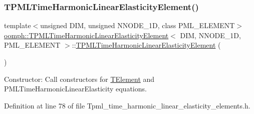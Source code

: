 \subsubsection{\texorpdfstring{T\+P\+M\+L\+Time\+Harmonic\+Linear\+Elasticity\+Element()}{TPMLTimeHarmonicLinearElasticityElement()}\hspace{0.1cm}{\footnotesize\ttfamily [1/2]}}
{\footnotesize\ttfamily template$<$unsigned D\+IM, unsigned N\+N\+O\+D\+E\+\_\+1D, class P\+M\+L\+\_\+\+E\+L\+E\+M\+E\+NT$>$ \\
\hyperlink{classoomph_1_1TPMLTimeHarmonicLinearElasticityElement}{oomph\+::\+T\+P\+M\+L\+Time\+Harmonic\+Linear\+Elasticity\+Element}$<$ D\+IM, N\+N\+O\+D\+E\+\_\+1D, P\+M\+L\+\_\+\+E\+L\+E\+M\+E\+NT $>$\+::\hyperlink{classoomph_1_1TPMLTimeHarmonicLinearElasticityElement}{T\+P\+M\+L\+Time\+Harmonic\+Linear\+Elasticity\+Element} (\begin{DoxyParamCaption}{ }\end{DoxyParamCaption})\hspace{0.3cm}{\ttfamily [inline]}}



Constructor\+: Call constructors for \hyperlink{classoomph_1_1TElement}{T\+Element} and P\+M\+L\+Time\+Harmonic\+Linear\+Elasticity equations. 



Definition at line 78 of file Tpml\+\_\+time\+\_\+harmonic\+\_\+linear\+\_\+elasticity\+\_\+elements.\+h.

\mbox{\label{classoomph_1_1TPMLTimeHarmonicLinearElasticityElement_a1e1b7ce2befd4346100a5210d10ba770}} 
